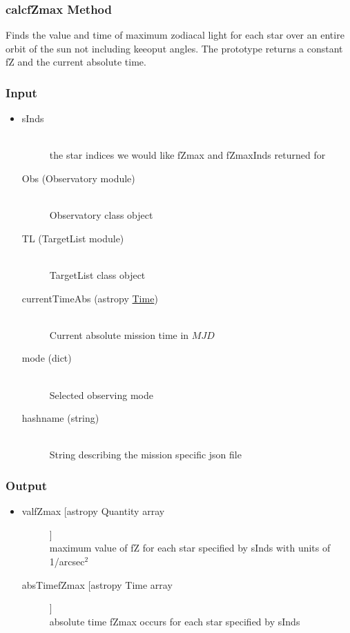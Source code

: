 \documentclass[cleanfoot]{asme2ej}
\begin{document}
\subsubsection{calcfZmax Method} \label{sec:calcfZmaxtask}
Finds the value and time of maximum zodiacal light for each star over an entire orbit of the sun not including keeoput angles. The prototype returns a constant fZ and the current absolute time.
\subsubsection*{Input}
\begin{itemize}
\item
\begin{description}
    \item[sInds] \hfill \\ the star indices we would like fZmax and fZmaxInds returned for
    \item[Obs (Observatory module)] \hfill \\ Observatory class object
    \item[TL (TargetList module)] \hfill \\ TargetList class object
    \item[currentTimeAbs (astropy \href{http://astropy.readthedocs.org/en/latest/time/index.html}{Time})] \hfill \\ Current absolute mission time in $ MJD $
    \item[mode (dict)] \hfill \\ Selected observing mode
    \item[hashname (string)] \hfill \\ String describing the mission specific json file
\end{description}
\end{itemize}
\subsubsection*{Output}
\begin{itemize}
\item
\begin{description}
    \item[valfZmax [astropy Quantity array]] \hfill \\ maximum value of fZ for each star specified by sInds with units of 1/arcsec$^2$
    \item[absTimefZmax [astropy Time array]] \hfill \\ absolute time fZmax occurs for each star specified by sInds
\end{description}
\end{itemize}
\end{document}
